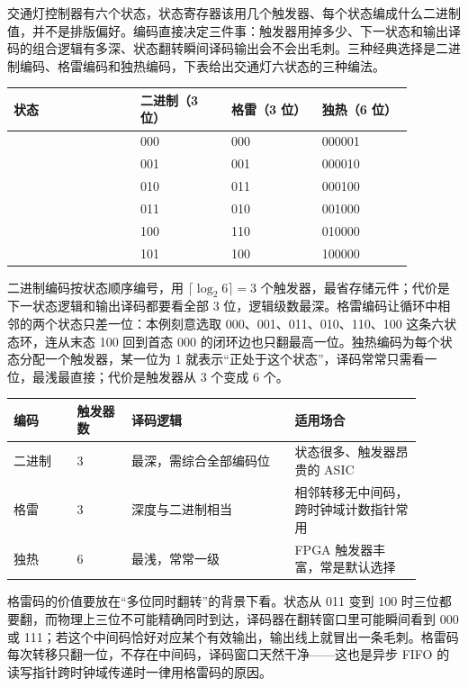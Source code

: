 交通灯控制器有六个状态，状态寄存器该用几个触发器、每个状态编成什么二进制值，并不是排版偏好。编码直接决定三件事：触发器用掉多少、下一状态和输出译码的组合逻辑有多深、状态翻转瞬间译码输出会不会出毛刺。三种经典选择是二进制编码、格雷编码和独热编码，下表给出交通灯六状态的三种编法。

\begin{longtable}{L{0.28\linewidth}L{0.2\linewidth}L{0.2\linewidth}L{0.2\linewidth}}
\toprule
状态 & 二进制（3 位） & 格雷（3 位） & 独热（6 位） \\
\midrule
{} & 000 & 000 & 000001 \\
 & 001 & 001 & 000010 \\
 & 010 & 011 & 000100 \\
 & 011 & 010 & 001000 \\
 & 100 & 110 & 010000 \\
 & 101 & 100 & 100000 \\
\bottomrule
\end{longtable}

二进制编码按状态顺序编号，用 $\lceil\log_2 6\rceil=3$ 个触发器，最省存储元件；代价是下一状态逻辑和输出译码都要看全部 3 位，逻辑级数最深。格雷编码让循环中相邻的两个状态只差一位：本例刻意选取 000、001、011、010、110、100 这条六状态环，连从末态 100 回到首态 000 的闭环边也只翻最高一位。独热编码为每个状态分配一个触发器，某一位为 1 就表示“正处于这个状态”，译码常常只需看一位，最浅最直接；代价是触发器从 3 个变成 6 个。

\begin{longtable}{L{0.14\linewidth}L{0.12\linewidth}L{0.36\linewidth}L{0.28\linewidth}}
\toprule
编码 & 触发器数 & 译码逻辑 & 适用场合 \\
\midrule
二进制 & 3 & 最深，需综合全部编码位 & 状态很多、触发器昂贵的 ASIC \\
格雷 & 3 & 深度与二进制相当 & 相邻转移无中间码，跨时钟域计数指针常用 \\
独热 & 6 & 最浅，常常一级 & FPGA 触发器丰富，常是默认选择 \\
\bottomrule
\end{longtable}

格雷码的价值要放在“多位同时翻转”的背景下看。状态从 011 变到 100 时三位都要翻，而物理上三位不可能精确同时到达，译码器在翻转窗口里可能瞬间看到 000 或 111；若这个中间码恰好对应某个有效输出，输出线上就冒出一条毛刺。格雷码每次转移只翻一位，不存在中间码，译码窗口天然干净——这也是异步 FIFO 的读写指针跨时钟域传递时一律用格雷码的原因。

